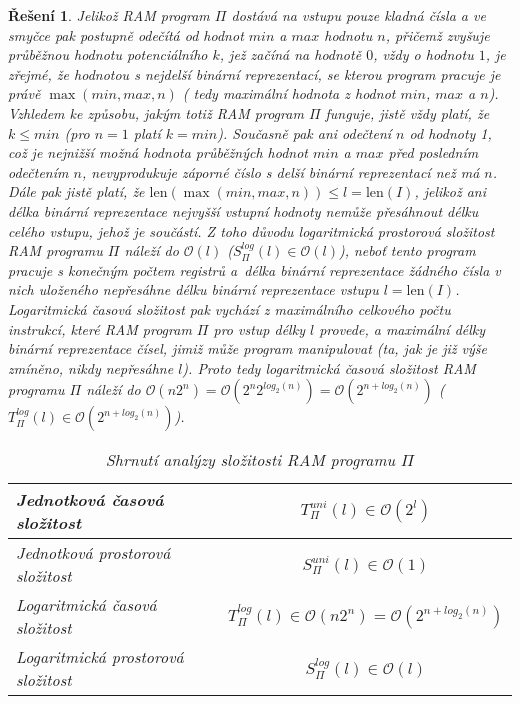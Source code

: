 \documentclass[a4paper]{article}
\let\var\mathit
\let\fnc\mathrm
\newcommand{\bigO}[1]{\mathcal{O}(#1)}
\newcommand{\len}[1]{\fnc{len}(#1)}
\theoremstyle{result}
\newtheorem*{result}{Řešení}
\begin{document}
\begin{enumerate}
\begin{result}
        Jelikož RAM program $\Pi$ dostává na vstupu pouze kladná čísla a ve smyčce pak postupně odečítá od hodnot $\var{min}$ a $\var{max}$ hodnotu $n$, přičemž zvyšuje průběžnou hodnotu potenciálního $k$, jež začíná na hodnotě $0$, vždy o hodnotu $1$, je zřejmé, že hodnotou s nejdelší binární reprezentací, se kterou program pracuje je právě $\max(\var{min}, \var{max}, n)$ ( tedy maximální hodnota z hodnot $\var{min}$, $\var{max}$ a $n$). Vzhledem ke způsobu, jakým totiž RAM program $\Pi$ funguje, jistě vždy platí, že $k \le \var{min}$ (pro $n = 1$ platí $k = \var{min}$). Současně pak ani odečtení $n$ od hodnoty 1, což je nejnižší možná hodnota průběžných hodnot $\var{min}$ a $\var{max}$ před posledním odečtením $n$, nevyprodukuje záporné číslo s delší binární reprezentací než má $n$. Dále pak jistě platí, že $\len{\max(\var{min}, \var{max}, n)} \le l = \len{I}$, jelikož ani délka binární reprezentace nejvyšší vstupní hodnoty nemůže přesáhnout délku celého vstupu, jehož je součástí. Z toho důvodu logaritmická prostorová složitost RAM programu $\Pi$ náleží do $\bigO{l}$ ($S_\Pi^{log}(l) \in \bigO{l}$), neboť tento program pracuje s konečným počtem registrů a~délka binární reprezentace žádného čísla v nich uloženého nepřesáhne délku binární reprezentace vstupu $l = \len{I}$. Logaritmická časová složitost pak vychází z maximálního celkového počtu instrukcí, které RAM program $\Pi$ pro vstup délky $l$ provede, a maximální délky binární reprezentace čísel, jimiž může program manipulovat (ta, jak je již výše zmíněno, nikdy nepřesáhne $l$). Proto tedy logaritmická časová složitost RAM programu $\Pi$ náleží do $\bigO{n2^n} = \bigO{2^n2^{log_2(n)}} = \bigO{2^{n + log_2(n)}}$ ($T_\Pi^{log}(l) \in \bigO{2^{n + log_2(n)}}$).

        \begin{table}[h]
        \centering
        \begin{tabular}{|l|c|}
        \hline
        Jednotková časová složitost & $T_\Pi^{uni}(l) \in \bigO{2^l}$ \\
        \hline
        Jednotková prostorová složitost & $S_\Pi^{uni}(l) \in \bigO{1}$ \\
        \hline
        Logaritmická časová složitost & $T_\Pi^{log}(l) \in \bigO{n2^n} = \bigO{2^{n + log_2(n)}}$ \\
        \hline
        Logaritmická prostorová složitost & $S_\Pi^{log}(l) \in \bigO{l}$ \\
        \hline
        \end{tabular}
        \caption{Shrnutí analýzy složitosti RAM programu $\Pi$}
        \end{table}
    \end{result}




\end{enumerate}
\end{document}
